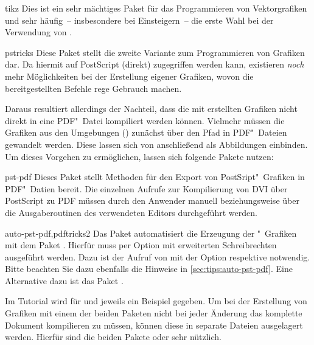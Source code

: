 \begin{packages}
\item[tikz]
  Dies ist ein sehr mächtiges Paket für das Programmieren von Vektorgrafiken 
  und sehr häufig~-- insbesondere bei Einsteigern~-- die erste Wahl bei der 
  Verwendung von .
\item[pstricks]
  Diese Paket stellt die zweite Variante zum Programmieren von Grafiken dar. 
  Da hiermit auf PostScript (direkt) zugegriffen werden kann, existieren 
  \emph{noch} mehr Möglichkeiten bei der Erstellung eigener Grafiken, wovon
  die bereitgestellten Befehle rege Gebrauch machen. 
  
  Daraus resultiert allerdings der Nachteil, dass die mit  
  erstellten Grafiken nicht direkt in eine PDF"~Datei kompiliert werden können. 
  Vielmehr müssen die Grafiken aus den Umgebungen 
  () zunächst über den Pfad 
   in PDF"~Dateien gewandelt werden. Diese 
  lassen sich von  anschließend als Abbildungen einbinden. Um 
  dieses Vorgehen zu ermöglichen, lassen sich folgende Pakete nutzen:
  \begin{packages}
  \item[pst-pdf]
    Dieses Paket stellt Methoden für den Export von PostSript"~Grafiken in 
    PDF"~Datien bereit. Die einzelnen Aufrufe zur Kompilierung von DVI über 
    PostScript zu PDF müssen durch den Anwender manuell beziehungsweise über 
    die Ausgaberoutinen des verwendeten Editors durchgeführt werden.
  \item[auto-pst-pdf,pdftricks2]
    Das Paket automatisiert die Erzeugung der "~Grafiken mit 
    dem Paket . Hierfür muss  per Option mit 
    erweiterten Schreibrechten ausgeführt werden. Dazu ist der Aufruf von 
     mit der Option  respektive 
     notwendig. Bitte beachten Sie dazu ebenfalls die 
    Hinweise in \autoref{sec:tips:auto-pst-pdf}. Eine Alternative dazu ist das 
    Paket .
  \end{packages}
\end{packages}
%
Im Tutorial  wird für  und  
jeweils ein Beispiel gegeben. Um bei der Erstellung von Grafiken mit einem der 
beiden Paketen nicht bei jeder Änderung das komplette Dokument kompilieren zu 
müssen, können diese in separate Dateien ausgelagert werden. Hierfür sind die 
beiden Pakete  oder  sehr nützlich.


